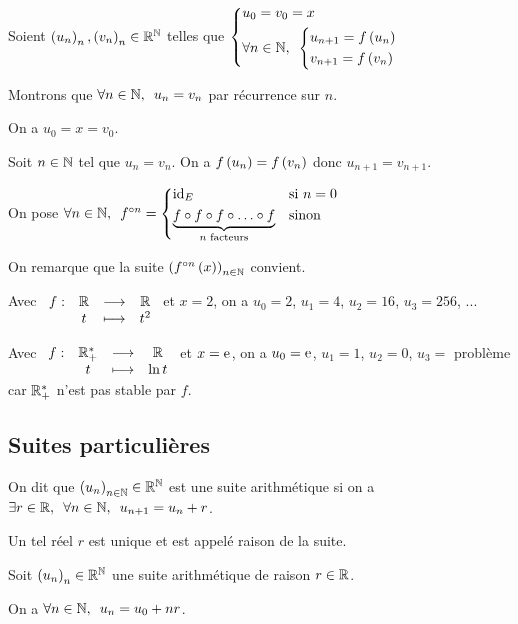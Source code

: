 \begin{dem}
\unicite

Soient \(\left(u_n\right)_n,\left(v_n\right)_n\in\mathbb{R}^{\mathbb{N}}\) telles que \(\begin{dcases}u_0=v_0=x \\ \quantifs{\forall n\in\N}\begin{dcases}u_{n+1}=f\paren{u_n} \\ v_{n+1}=f\paren{v_n}\end{dcases}\end{dcases}\)

Montrons que \(\quantifs{\forall n\in\N}u_n=v_n\) par récurrence sur \(n\).

On a \(u_0=x=v_0\).

Soit \(n\in\mathbb{N}\) tel que \(u_n=v_n\). On a \(f\left(u_n\right)=f\left(v_n\right)\) donc \(u_{n+1}=v_{n+1}\).

\existence

On pose \(\quantifs{\forall n\in\N}f^{\rond n}=\begin{dcases}\id{E} &\text{si }n=0 \\ \underbrace{f\rond f\rond f\rond\dots\rond f}_{n\text{ facteurs}} &\text{sinon}\end{dcases}\)

On remarque que la suite \(\left(f^{\circ n}\left(x\right)\right)_{n\in\mathbb{N}}\) convient.
\end{dem}

\begin{ex}
Avec \(\begin{array}[t]{cccc}f : & \mathbb{R} & \longrightarrow & \mathbb{R} \\ & t & \longmapsto & t^2\end{array}\) et \(x=2\), on a \(u_0=2\), \(u_1=4\), \(u_2=16\), \(u_3=256\), ...

Avec \(\begin{array}[t]{cccc}f : & \mathbb{R}_+^* & \longrightarrow & \mathbb{R} \\ & t & \longmapsto & \ln t\end{array}\) et \(x=\mathrm{e}^{}\), on a \(u_0=\mathrm{e}^{}\), \(u_1=1\), \(u_2=0\), \(u_3=\) problème car \(\mathbb{R}_+^*\) n'est pas stable par \(f\).
\end{ex}

\subsection{Suites particulières}

\begin{defi}
On dit que \(\left(u_n\right)_{n\in\mathbb{N}}\in\mathbb{R}^{\mathbb{N}}\) est une suite arithmétique si on a \(\quantifs{\exists r\in\R;\forall n\in\N}u_{n+1}=u_n+r\).

Un tel réel \(r\) est unique et est appelé raison de la suite.
\end{defi}

\begin{prop}
Soit \(\left(u_n\right)_n\in\mathbb{R}^{\mathbb{N}}\) une suite arithmétique de raison \(r\in\mathbb{R}\).

On a \(\quantifs{\forall n\in\N}u_n=u_0+nr\).
\end{prop}

